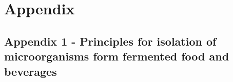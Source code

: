 \chapter{Appendix}
\section{Appendix 1 - Principles for isolation of microorganisms form fermented food and beverages}
\label{appendix1}

